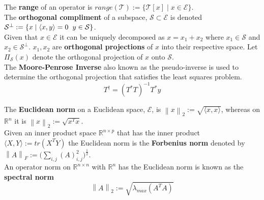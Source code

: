 \documentclass[a4paper]{article}
\newcommand{\norm}[1]{\left\lVert#1\right\rVert}
\begin{document}
\noindent The \textbf{range} of an operator is $range(\mathcal{T}) := \{\mathcal{T}[x]\mid x\in\mathcal{E}\}$.\\

\noindent The \textbf{orthogonal compliment} of a subspace, $\mathcal{S}\subset\mathcal{E}$ is denoted $\mathcal{S}^{\perp} := \{x\mid\langle x,y\rangle = 0\hspace{2mm}y\in\mathcal{S}\}$.\\

\noindent Given that $x\in\mathcal{E}$ it can be uniquely decomposed as $x = x_{1} + x_{2}$ where $x_{1}\in\mathcal{S}$ and $x_{2}\in\mathcal{S}^{\perp}$. $x_{1},x_{2}$ are \textbf{orthogonal projections} of $x$ into their respective space. Let $\Pi_{\mathcal{S}}(x)$ denote the orthogonal projection of $x$ onto $\mathcal{S}$.\\

\noindent The \textbf{Moore-Penrose Inverse} also known as the pseudo-inverse is used to determine the orthogonal projection that satisfies the least squares problem.
$$
T^{\dagger} = (T^{*}T)^{-1}T^{*}y
$$

\noindent The \textbf{Euclidean norm} on a Euclidean space, $\mathcal{E}$, is $\norm{x}_{2} := \sqrt{\langle x,x\rangle}$, whereas on $\mathbb{R}^{n}$ it is $\norm{x}_{2} := \sqrt{x^{T}x}$.\\

\noindent Given an inner product space $\mathbb{R}^{n\times p}$ that has the inner product $\langle X,Y\rangle := tr(X^{T}Y)$ the Euclidean norm is the \textbf{Forbenius norm} denoted by $\norm{A}_{F} := \bigg(\sum_{i,j}(A)_{i,j}^{2}\bigg)^{\frac{1}{2}}$.\\

\noindent An operator norm on $\mathbb{R}^{n\times n}$ with $\mathbb{R}^{n}$ has the Euclidean norm is known as the \textbf{spectral norm}
$$
\norm{A}_{2} := \sqrt{\lambda_{max}(A^{T}A)}
$$
\end{document}
